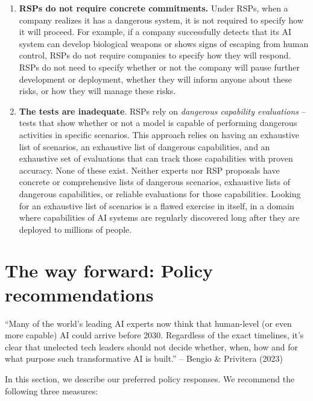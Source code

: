 \documentclass[12pt,a4paper]{article}
\begin{document}
\begin{enumerate}
   \item \textbf{RSPs do not require concrete commitments. }Under RSPs, when a company realizes it has a dangerous system, it is not required to specify how it will proceed. For example, if a company successfully detects that its AI system can develop biological weapons or shows signs of escaping from human control, RSPs do not require companies to specify how they will respond. RSPs do not need to specify whether or not the company will pause further development or deployment, whether they will inform anyone about these risks, or how they will manage these risks. 
  \item \textbf{The tests are inadequate}. RSPs rely on \textit{dangerous capability evaluations} – tests that show whether or not a model is capable of performing dangerous activities in specific scenarios. This approach relies on having an exhaustive list of scenarios, an exhaustive list of dangerous capabilities, and an exhaustive set of evaluations that can track those capabilities with proven accuracy. None of these exist. Neither experts nor RSP proposals have concrete or comprehensive lists of dangerous scenarios, exhaustive lists of dangerous capabilities, or reliable evaluations for those capabilities. Looking for an exhaustive list of scenarios is a flawed exercise in itself, in a domain where capabilities of AI systems are regularly discovered long after they are deployed to millions of people. 
\end{enumerate}

\newpage
\section{The way forward: Policy recommendations}
\hfill\begin{minipage}{\dimexpr\textwidth-1cm}
“Many of the world’s leading AI experts now think that human-level (or even more capable) AI could arrive before 2030. Regardless of the exact timelines, it’s clear that unelected tech leaders should not decide whether, when, how and for what purpose such transformative AI is built.” – Bengio \& Privitera (2023)
\end{minipage}
\hspace{1cm}


In this section, we describe our preferred policy responses. We recommend the following three measures:
\end{document}
